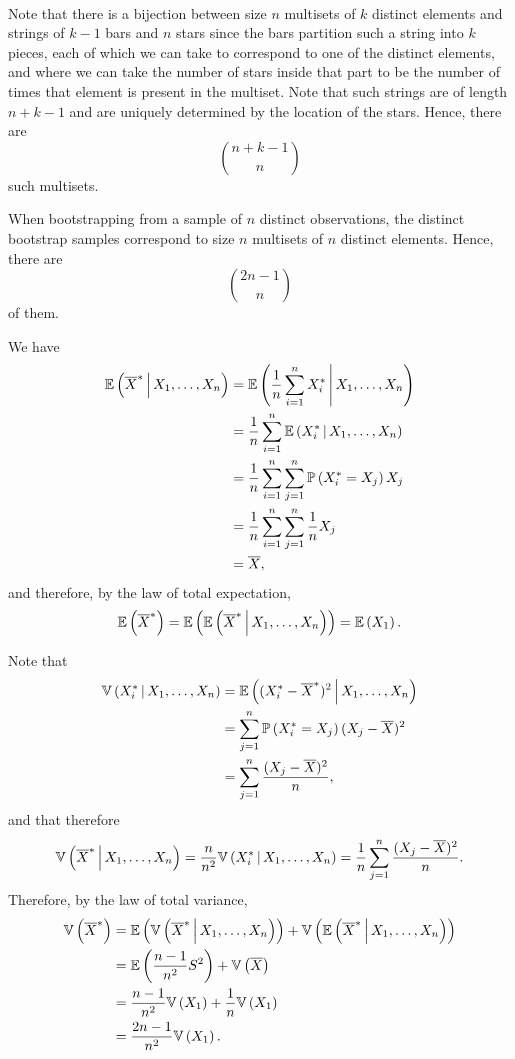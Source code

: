 \begin{ex}~
  \inputminted{python}{../code/08-03.py}
  \inputminted{text}{../output/08-03.txt}
\end{ex}

\begin{ex}
  Note that there is a bijection between size $n$ multisets of $k$ distinct
  elements and strings of $k-1$ bars and $n$ stars since the bars partition such
  a string into $k$ pieces, each of which we can take to correspond to one of
  the distinct elements, and where we can take the number of stars inside that
  part to be the number of times that element is present in the multiset.
  Note that such strings are of length $n+k-1$ and are uniquely determined by
  the location of the stars. Hence, there are
  \[
    \binom{n+k-1}{n}
  \]
  such multisets.

  When bootstrapping from a sample of $n$ distinct observations, the distinct
  bootstrap samples correspond to size $n$ multisets of $n$ distinct elements.
  Hence, there are
  \[
    \binom{2n-1}{n}
  \]
  of them.
\end{ex}

\begin{ex}
  We have
  \begin{align*}
    \mathbb{E}\left(\overline{X}^* \,\middle|\, X_1,\ldots,X_n\right)
     & =\mathbb{E}\left(\frac{1}{n}\sum_{i=1}^n X^*_i \,\middle|\, X_1,\ldots,X_n\right)   \\
     & =\frac{1}{n}\sum_{i=1}^n \mathbb{E}\left(X^*_i \,\middle|\, X_1,\ldots,X_n\right)   \\
     & =\frac{1}{n}\sum_{i=1}^n\sum_{j=1}^n \mathbb{P}\left(X^*_i=X_j\right)X_j \\
     & =\frac{1}{n}\sum_{i=1}^n\sum_{j=1}^n \frac{1}{n}X_j   \\
     & =\overline{X},
  \end{align*}
  and therefore, by the law of total expectation,
  \[
    \mathbb{E}\left(\overline{X}^*\right)
    =\mathbb{E}\left(\mathbb{E}\left(\overline{X}^* \,\middle|\, X_1,\ldots,X_n\right)\right)
    =\mathbb{E}\left(X_1\right).
  \]

  Note that
  \begin{align*}
    \mathbb{V}\left(X_i^* \,\middle|\, X_1,\ldots,X_n\right)
     & =\mathbb{E}\left((X_i^*-\overline{X}^*)^2 \,\middle|\, X_1,\ldots,X_n\right) \\
     & =\sum_{j=1}^n\mathbb{P}\left(X_i^*=X_j\right)(X_j-\overline{X})^2 \\
     & =\sum_{j=1}^n\frac{(X_j-\overline{X})^2}{n},
  \end{align*}
  and that therefore
  \[
    \mathbb{V}\left(\overline{X}^* \,\middle|\, X_1,\ldots,X_n\right)
    =\frac{n}{n^2}\mathbb{V}\left(X_i^* \,\middle|\, X_1,\ldots,X_n\right)
    =\frac{1}{n}\sum_{j=1}^n\frac{(X_j-\overline{X})^2}{n}.
  \]
  Therefore, by the law of total variance,
  \begin{align*}
    \mathbb{V}\left(\overline{X}^*\right)
     & =\mathbb{E}\left(\mathbb{V}\left(\overline{X}^* \,\middle|\, X_1,\ldots,X_n\right)\right)
    +\mathbb{V}\left(\mathbb{E}\left(\overline{X}^* \,\middle|\, X_1,\ldots,X_n\right)\right)               \\
     & = \mathbb{E}\left(\frac{n-1}{n^2}S^2\right) + \mathbb{V}\left(\overline{X}\right)  \\
     & =\frac{n-1}{n^2}\mathbb{V}\left(X_1\right)+\frac{1}{n}\mathbb{V}\left(X_1\right) \\
     & =\frac{2n-1}{n^2}\mathbb{V}\left(X_1\right).
  \end{align*}
\end{ex}

